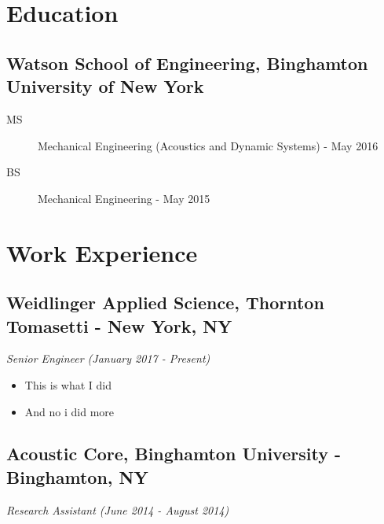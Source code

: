 \documentclass[10pt,letterpaper]{article}
\begin{document}
\hypertarget{education}{%
\section{Education}\label{education}}

\hypertarget{watson-school-of-engineering-binghamton-university-of-new-york}{%
\subsection{Watson School of Engineering, Binghamton University of New
York}\label{watson-school-of-engineering-binghamton-university-of-new-york}}

\begin{description}
\item[MS]
Mechanical Engineering (Acoustics and Dynamic Systems) - May 2016
\item[BS]
Mechanical Engineering - May 2015
\end{description}

\hypertarget{work-experience}{%
\section{Work Experience}\label{work-experience}}

\hypertarget{weidlinger-applied-science-thornton-tomasetti---new-york-ny}{%
\subsection{Weidlinger Applied Science, Thornton Tomasetti - New York,
NY}\label{weidlinger-applied-science-thornton-tomasetti---new-york-ny}}

\emph{Senior Engineer (January 2017 - Present)}

\begin{itemize}
\item
  This is what I did
\item
  And no i did more
\end{itemize}

\hypertarget{acoustic-core-binghamton-university---binghamton-ny}{%
\subsection{Acoustic Core, Binghamton University - Binghamton,
NY}\label{acoustic-core-binghamton-university---binghamton-ny}}

\emph{Research Assistant (June 2014 - August 2014)}
\end{document}
